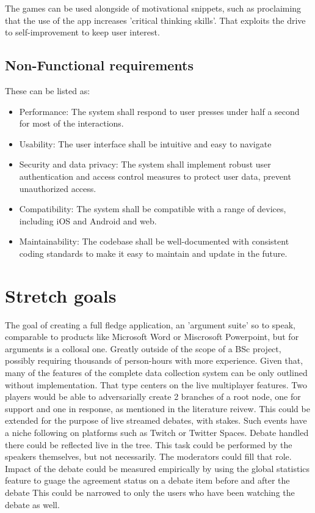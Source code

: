 \documentclass{report}
\begin{document}
The games can be used alongside of motivational snippets, such as proclaiming that the use of the app increases 'critical thinking skills'. 
That exploits the drive to self-improvement to keep user interest.

\subsection{Non-Functional requirements}
These can be listed as:
\begin{itemize}
  \item Performance: The system shall respond to user presses under half a second for most of the interactions.
  \item Usability: The user interface shall be intuitive and easy to navigate
  \item Security and data privacy: The system shall implement robust user authentication and access control measures to protect user data, prevent unauthorized access.
  \item Compatibility: The system shall be compatible with a range of devices, including iOS and Android and web.
  \item Maintainability: The codebase shall be well-documented with consistent coding standards to make it easy to maintain and update in the future.
\end{itemize}

\section{Stretch goals}
The goal of creating a full fledge application, an 'argument suite' so to speak, comparable to products like Microsoft Word or Miscrosoft Powerpoint, but for arguments is a collosal one.
Greatly outside of the scope of a BSc project, possibly requiring thousands of person-hours with more experience.
Given that, many of the features of the complete data collection system can be only outlined without implementation.
That type centers on the live multiplayer features. Two players would be able to adversarially create 2 branches of a root node, one for support and one in response, as mentioned in the literature reivew. 
This could be extended for the purpose of live streamed debates, with stakes. Such events have a niche following on platforms such as Twitch or Twitter Spaces.
Debate handled there could be reflected live in the tree. This task could be performed by the speakers themselves, but not necessarily. The moderators could fill that role.
Impact of the debate could be measured empirically by using the global statistics feature to guage the agreement status on a debate item before and after the debate
This could be narrowed to only the users who have been watching the debate as well.
\end{document}
